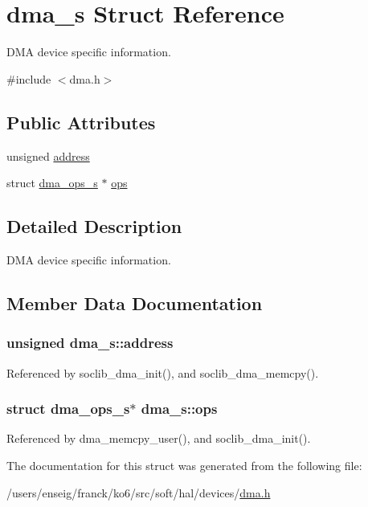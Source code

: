 \hypertarget{structdma__s}{\section{dma\-\_\-s Struct Reference}
\label{structdma__s}
}


D\-M\-A device specific information.  




{\ttfamily \#include $<$dma.\-h$>$}

\subsection*{Public Attributes}
\begin{DoxyCompactItemize}
\item 
unsigned \hyperlink{structdma__s_a2917d363120e289973599db57ca11973}{address}
\item 
struct \hyperlink{structdma__ops__s}{dma\-\_\-ops\-\_\-s} $\ast$ \hyperlink{structdma__s_ac213f02a6ace026dfcd3de21f16347ba}{ops}
\end{DoxyCompactItemize}


\subsection{Detailed Description}
D\-M\-A device specific information. 

\subsection{Member Data Documentation}
\hypertarget{structdma__s_a2917d363120e289973599db57ca11973}{
\subsubsection[{address}]{\setlength{\rightskip}{0pt plus 5cm}unsigned dma\-\_\-s\-::address}}\label{structdma__s_a2917d363120e289973599db57ca11973}


Referenced by soclib\-\_\-dma\-\_\-init(), and soclib\-\_\-dma\-\_\-memcpy().

\hypertarget{structdma__s_ac213f02a6ace026dfcd3de21f16347ba}{
\subsubsection[{ops}]{\setlength{\rightskip}{0pt plus 5cm}struct {\bf dma\-\_\-ops\-\_\-s}$\ast$ dma\-\_\-s\-::ops}}\label{structdma__s_ac213f02a6ace026dfcd3de21f16347ba}


Referenced by dma\-\_\-memcpy\-\_\-user(), and soclib\-\_\-dma\-\_\-init().



The documentation for this struct was generated from the following file\-:\begin{DoxyCompactItemize}
\item 
/users/enseig/franck/ko6/src/soft/hal/devices/\hyperlink{dma_8h}{dma.\-h}\end{DoxyCompactItemize}

